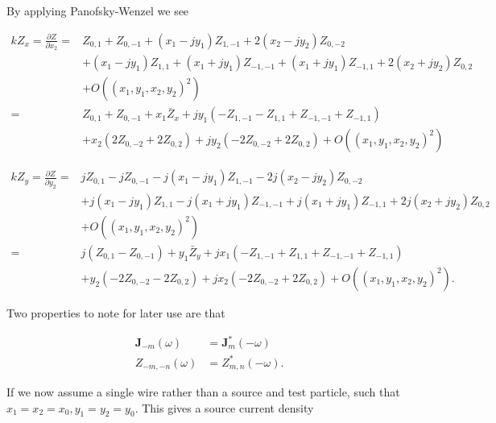 \documentclass[12pt,a4paper,twopage,openright]{article}
\begin{document}
By applying Panofsky-Wenzel we see

\begin{align}
kZ_{x} =\frac{\partial Z}{\partial x_{2}} = & Z_{0,1} + Z_{0,-1} + \left( x_{1} - jy_{1} \right) Z_{1,-1} + 2\left( x_{2} - jy_{2} \right) Z_{0,-2} \nonumber \\
						&+ \left( x_{1} - jy_{1} \right) Z_{1,1} + \left( x_{1} + jy_{1} \right) Z_{-1,-1} + \left( x_{1} + jy_{1} \right) Z_{-1,1} + 2\left( x_{2} + jy_{2} \right) Z_{0,2} \nonumber \\
						& + O\left( \left( x_{1},y_{1},x_{2},y_{2} \right)^{2} \right) \nonumber \\
						= & Z_{0,1} + Z_{0,-1} + x_{1}\bar{Z}_{x} + jy_{1} \left( -Z_{1,-1} - Z_{1,1} + Z_{-1,-1} + Z_{-1,1} \right) \nonumber \\
						& + x_{2}\left( 2Z_{0,-2} + 2Z_{0,2}  \right) + jy_{2}\left( -2Z_{0,-2} + 2Z_{0,2}  \right) +  O\left( \left( x_{1},y_{1},x_{2},y_{2} \right)^{2} \right)
\end{align}

\begin{align}
kZ_{y} =\frac{\partial Z}{\partial y_{2}} = & jZ_{0,1} - jZ_{0,-1} - j\left( x_{1} - jy_{1} \right) Z_{1,-1} - 2j\left( x_{2} - jy_{2} \right) Z_{0,-2} \nonumber \\
						&+ j\left( x_{1} - jy_{1} \right) Z_{1,1} - j\left( x_{1} + jy_{1} \right) Z_{-1,-1} + j\left( x_{1} + jy_{1} \right) Z_{-1,1} + 2j\left( x_{2} + jy_{2} \right) Z_{0,2} \nonumber \\
						& + O\left( \left( x_{1},y_{1},x_{2},y_{2} \right)^{2} \right) \nonumber \\
						= & j\left(Z_{0,1} - Z_{0,-1} \right)+ y_{1}\bar{Z}_{y} + jx_{1} \left( -Z_{1,-1} + Z_{1,1} + Z_{-1,-1} + Z_{-1,1} \right) \nonumber \\
						& + y_{2}\left(- 2Z_{0,-2} - 2Z_{0,2}  \right) + jx_{2}\left( -2Z_{0,-2} + 2Z_{0,2}  \right) +  O\left( \left( x_{1},y_{1},x_{2},y_{2} \right)^{2} \right).
\end{align}

Two properties to note for later use are that

\begin{align}
\textbf{J}_{-m} \left( \omega \right) & = \textbf{J}_{m}^{*} \left( -\omega \right) \\
Z_{-m,-n} \left( \omega \right) & = Z_{m,n}^{*} \left( -\omega \right).
\end{align}

If we now assume a single wire rather than a source and test particle, such that $x_{1}=x_{2}=x_{0}, y_{1}=y_{2}=y_{0}$. This gives a source current density
\end{document}
